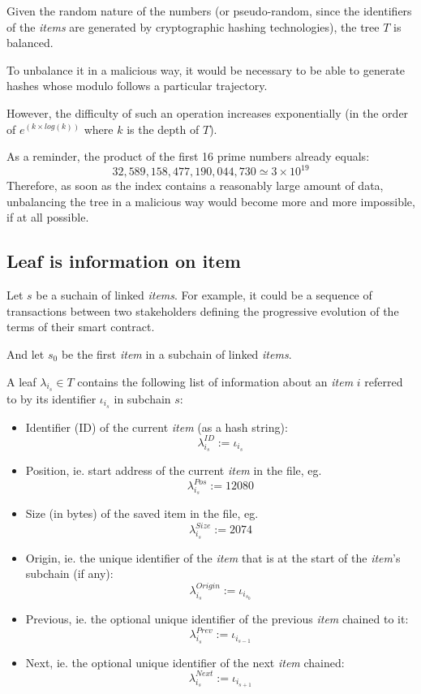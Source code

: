 \documentclass[twoside,twocolumn]{article}
\theoremstyle{definition}
\theoremstyle{remark}
\begin{document}
Given the random nature of the numbers (or pseudo-random, since the identifiers of the \emph{items} are generated by cryptographic hashing 
technologies), the tree $T$ is balanced.

To unbalance it in a malicious way, it would be necessary to be able to generate hashes whose modulo follows a particular trajectory.

However, the difficulty of such an operation increases exponentially (in the order of $e^{\left(k \times log(k) \right)}$ where $k$ is the depth of 
$T$).

As a reminder, the product of the first 16 prime numbers already equals: $$
    32,589,158,477,190,044,730 \simeq 3 \times 10^{19}
$$
Therefore, as soon as the index contains a reasonably large amount of data, unbalancing the tree in a malicious way would become more and more 
impossible, if at all possible.

\subsection{Leaf is information on item}

Let $s$ be a suchain of linked \emph{items}. For example, it could be a sequence of transactions between two stakeholders defining the progressive 
evolution of the terms of their smart contract.

And let $s_0$ be the first \emph{item} in a subchain of linked \emph{items}.

\vspace{1em} %

A leaf $\lambda_{i_s} \in T$ contains the following list of information about an \emph{item} $i$ referred to by its identifier $\iota_{i_s}$ in 
subchain $s$:
\begin{itemize}
    \item Identifier (ID) of the current \emph{item} (as a hash string):$$
        \lambda_{i_s}^{ID} := \iota_{i_s}
    $$
    \item Position, ie. start address of the current \emph{item} in the file, eg. $$
        \lambda_{i_s}^{Pos} := 12080
    $$
    \item Size (in bytes) of the saved item in the file, eg. $$
        \lambda_{i_s}^{Size} := 2074
    $$
    \item Origin, ie. the unique identifier of the \emph{item} that is at the start of the \emph{item}'s subchain (if any):$$
        \lambda_{i_s}^{Origin} := \iota_{i_{s_0}}
    $$
    \item Previous, ie. the optional unique identifier of the previous \emph{item} chained to it:$$
        \lambda_{i_s}^{Prev} := \iota_{i_{s-1}}
    $$
    \item Next, ie. the optional unique identifier of the next \emph{item} chained:$$
        \lambda_{i_s}^{Next} := \iota_{i_{s+1}}
    $$
\end{itemize}
\end{document}
